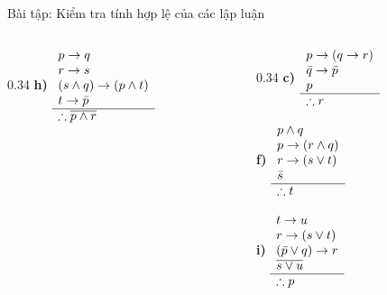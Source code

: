 \documentclass[aspectratio=169, 11pt]{beamer}
\begin{document}
\begin{frame}{Bài tập: Kiểm tra tính hợp lệ của các lập luận}
\begin{columns}[t, onlytextwidth]
\begin{column}{0.34\textwidth}
    \vspace{0.25cm}
    \textbf{h)}\; $\begin{array}[c]{l}
      p \rightarrow q \\
      r \rightarrow s \\
      (s \land q) \rightarrow (p \land t) \\
      t \rightarrow \bar{p} \\
      \hline
      \therefore \overline{p \land r}
    \end{array}$
  \end{column}
  \begin{column}{0.34\textwidth}
    \small
    \textbf{c)}\; $\begin{array}[c]{l}
      p \rightarrow (q \rightarrow r) \\
      \bar{q} \rightarrow \bar{p} \\
      p \\
      \hline
      \therefore r
    \end{array}$

    \vspace{0.25cm}
    \textbf{f)}\; $\begin{array}[c]{l}
      p \land q \\
      p \rightarrow (r \land q) \\
      r \rightarrow (s \lor t) \\
      \bar{s} \\
      \hline
      \therefore t
    \end{array}$

    \vspace{0.25cm}
    \textbf{i)}\; $\begin{array}[c]{l}
      t \rightarrow u \\
      r \rightarrow (s \lor t) \\
      (\bar{p} \lor q) \rightarrow r \\
      \overline{s \lor u} \\
      \hline
      \therefore p
    \end{array}$
  \end{column}
\end{columns}
\end{frame}
\end{document}
